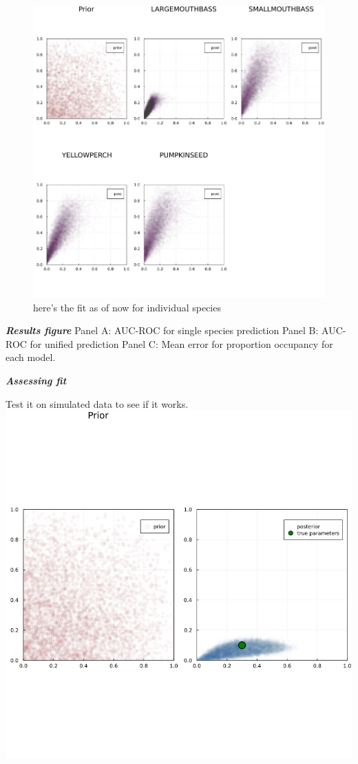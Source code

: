 \documentclass[10pt,oneside]{article}
\makeatletter
\def\maxwidth{\ifdim\Gin@nat@width>\linewidth\linewidth
\else\Gin@nat@width\fi}
\let\Oldincludegraphics\includegraphics
\renewcommand{\includegraphics}[1]{\Oldincludegraphics[width=\maxwidth]{#1}}
\makeatother
\begin{document}
\begin{figure}
\hypertarget{fig:abcfit}{%
\centering
\includegraphics{./figures/abcfit.png}
\caption{here's the fit as of now for individual
species}\label{fig:abcfit}
}
\end{figure}

\textbf{\emph{Results figure}} Panel A: AUC-ROC for single species
prediction Panel B: AUC-ROC for unified prediction Panel C: Mean error
for proportion occupancy for each model.

\textbf{\emph{Assessing fit}}

Test it on simulated data to see if it works.
\includegraphics{./figures/comparedtotruth.png}
\end{document}
